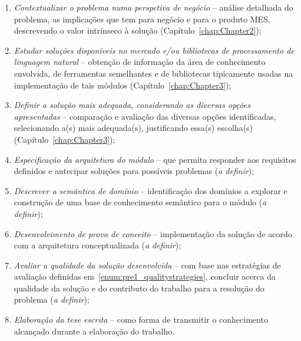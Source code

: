 \begin{enumerate}
    \item
    \label{enum:pre1_objectives_1}
    {
        \textit{Contextualizar o problema numa perspetiva de negócio} -- análise detalhada do problema, as implicações que tem para negócio e para o produto \gls{MES}, descrevendo o valor intrínseco à solução (Capítulo~\ref{chap:Chapter2});
    }
    \item
    \label{enum:pre1_objectives_2}
    {
        \textit{Estudar soluções disponíveis no mercado e/ou bibliotecas de processamento de linguagem natural} -- obtenção de informação da área de conhecimento envolvida, de ferramentas semelhantes e de bibliotecas tipicamente usadas na implementação de tais módulos (Capítulo~\ref{chap:Chapter3});
    }
    \item
    \label{enum:pre1_objectives_3}
    {
        \textit{Definir a solução mais adequada, considerando as diversas opções apresentadas} -- comparação e avaliação das diversas opções identificadas, selecionando a(s) mais adequada(s), justificando essa(s) escolha(s) (Capítulo~\ref{chap:Chapter3});
    }
    \item
    \label{enum:pre1_objectives_4}
    {
        \textit{Especificação da arquitetura do módulo} -- que permita responder aos requisitos definidos e antecipar soluções para possíveis problemas (\textit{a definir});
    }
    \item
    \label{enum:pre1_objectives_5}
    {
        \textit{Descrever a semântica de domínio} -- identificação dos domínios a explorar e construção de uma base de conhecimento semântico para o módulo (\textit{a definir});
    }
    \item
    \label{enum:pre1_objectives_6}
    {
        \textit{Desenvolvimento de prova de conceito} -- implementação da solução de acordo com a arquitetura conceptualizada (\textit{a definir});
    }
    \item
    \label{enum:pre1_objectives_7}
    {
        \textit{Avaliar a qualidade da solução desenvolvida} -- com base nas estratégias de avaliação definidas em~\ref{enum:pre1_qualitystrategies}, concluir acerca da qualidade da solução e do contributo do trabalho para a resolução do problema (\textit{a definir});
    }
    \item
    \label{enum:pre1_objectives_8}
    {
        \textit{Elaboração da tese escrita} -- como forma de transmitir o conhecimento alcançado durante a elaboração do trabalho.
    }
\end{enumerate}

